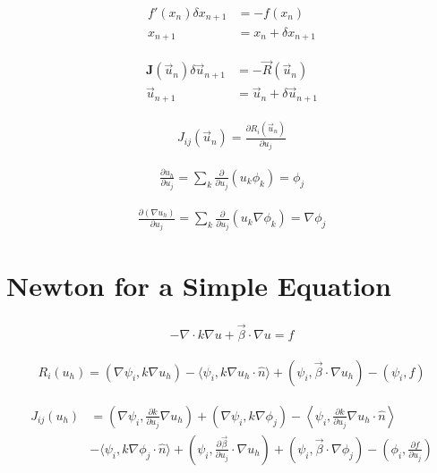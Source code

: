 \documentclass{article}
\begin{document}
	\begin{align*}
		f'(x_n) \delta x_{n+1} &= -f(x_n) \\
					   x_{n+1} &= x_n + \delta x_{n+1}
	\end{align*}
	
	\begin{align*}
		\mathbf{J}(\vec{u}_n) \delta\vec{u}_{n+1} &= -\vec{R}(\vec{u}_n) \\
									\vec{u}_{n+1} &= \vec{u}_n + \delta \vec{u}_{n+1}
	\end{align*}
	
	\begin{align*}
		J_{ij}(\vec{u}_n) = \frac{\partial R_i (\vec{u}_n)}{\partial u_j}
	\end{align*}
	
	\begin{align*}
		\frac{\partial u_h}{\partial u_j} = \sum_k \frac{\partial}{\partial u_j} (u_k \phi_k) = \phi_j
	\end{align*}
	
	\begin{align*}
		\frac{\partial(\nabla u_h)}{\partial u_j} = \sum_k \frac{\partial}{\partial u_j} (u_k \nabla \phi_k) = \nabla \phi_j
	\end{align*}
	
	\section*{Newton for a Simple Equation}
	
	\begin{align*}
		-\nabla \cdot k\nabla u + \vec{\beta} \cdot \nabla u = f
	\end{align*}
	
	\begin{align*}
		R_i(u_h) = (\nabla\psi_i, k \nabla u_h) - \langle \psi_i, k\nabla u_h \cdot \hat{n} \rangle + \left( \psi_i , \vec{\beta} \cdot \nabla u_h \right) - (\psi_i , f)
	\end{align*}
	
	\begin{align*}
		J_{ij}(u_h) &= \left( \nabla \psi_i , \frac{\partial k}{\partial u_j} \nabla u_h \right) + (\nabla \psi_i, k\nabla \phi_j) - \left \langle \psi_i , \frac{\partial k}{\partial u_j} \nabla u_h \cdot \hat{n} \right \rangle \\
		&- \langle \psi_i, k\nabla \phi_j \cdot \hat{n} \rangle + \left( \psi_i, \frac{\partial \vec{\beta}}{\partial u_j} \cdot \nabla u_h \right) + \left( \psi_i, \vec{\beta} \cdot \nabla \phi_j \right) - \left( \phi_i , \frac{\partial f}{\partial u_j} \right)
	\end{align*}
	
\end{document}
